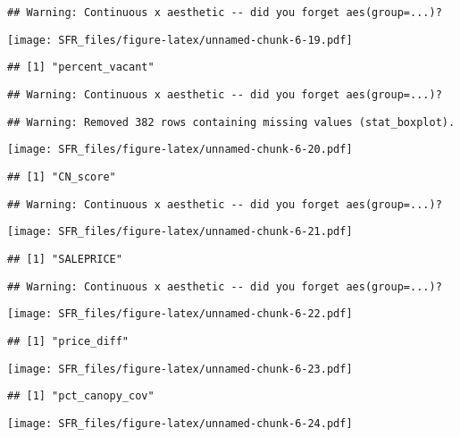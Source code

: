 \documentclass[]{article}
\begin{document}
\begin{verbatim}
## Warning: Continuous x aesthetic -- did you forget aes(group=...)?
\end{verbatim}

\texttt{[image: SFR\_files/figure-latex/unnamed-chunk-6-19.pdf]}

\begin{verbatim}
## [1] "percent_vacant"
\end{verbatim}

\begin{verbatim}
## Warning: Continuous x aesthetic -- did you forget aes(group=...)?
\end{verbatim}

\begin{verbatim}
## Warning: Removed 382 rows containing missing values (stat_boxplot).
\end{verbatim}

\texttt{[image: SFR\_files/figure-latex/unnamed-chunk-6-20.pdf]}

\begin{verbatim}
## [1] "CN_score"
\end{verbatim}

\begin{verbatim}
## Warning: Continuous x aesthetic -- did you forget aes(group=...)?
\end{verbatim}

\texttt{[image: SFR\_files/figure-latex/unnamed-chunk-6-21.pdf]}

\begin{verbatim}
## [1] "SALEPRICE"
\end{verbatim}

\begin{verbatim}
## Warning: Continuous x aesthetic -- did you forget aes(group=...)?
\end{verbatim}

\texttt{[image: SFR\_files/figure-latex/unnamed-chunk-6-22.pdf]}

\begin{verbatim}
## [1] "price_diff"
\end{verbatim}

\texttt{[image: SFR\_files/figure-latex/unnamed-chunk-6-23.pdf]}

\begin{verbatim}
## [1] "pct_canopy_cov"
\end{verbatim}

\texttt{[image: SFR\_files/figure-latex/unnamed-chunk-6-24.pdf]}
\end{document}
